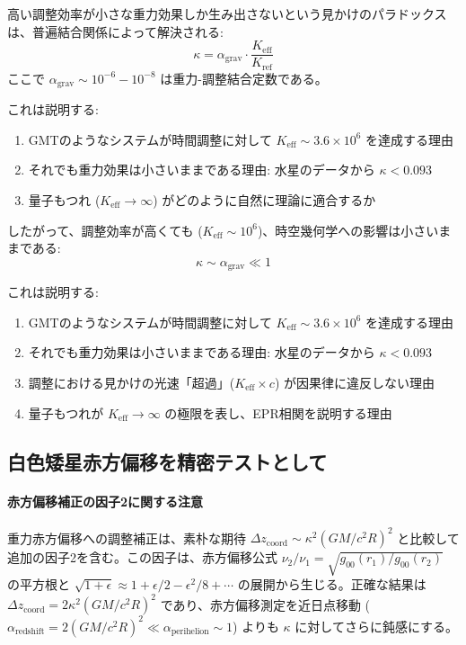 \documentclass[11pt,a4paper]{article}
\begin{document}
	高い調整効率が小さな重力効果しか生み出さないという見かけのパラドックスは、普遍結合関係によって解決される:
	\begin{equation}
		\boxed{\kappa = \alpha_{\text{grav}} \cdot \frac{K_{\mathrm{eff}}}{K_{\text{ref}}}}
	\end{equation}
	ここで $\alpha_{\text{grav}} \sim 10^{-6} - 10^{-8}$ は重力-調整結合定数である。
	
	これは説明する:
	\begin{enumerate}
		\item GMTのようなシステムが時間調整に対して $K_{\mathrm{eff}} \sim 3.6\times10^6$ を達成する理由
		\item それでも重力効果は小さいままである理由: 水星のデータから $\kappa < 0.093$
		\item 量子もつれ ($K_{\mathrm{eff}} \to \infty$) がどのように自然に理論に適合するか
	\end{enumerate}
	
	したがって、調整効率が高くても ($K_{\mathrm{eff}} \sim 10^6$)、時空幾何学への影響は小さいままである:
	\[
	\kappa \sim \alpha_{\text{grav}} \ll 1
	\]
	
	これは説明する:
	\begin{enumerate}
		\item GMTのようなシステムが時間調整に対して $K_{\mathrm{eff}} \sim 3.6\times10^6$ を達成する理由
		\item それでも重力効果は小さいままである理由: 水星のデータから $\kappa < 0.093$
		\item 調整における見かけの光速「超過」($K_{\mathrm{eff}} \times c$) が因果律に違反しない理由
		\item 量子もつれが $K_{\mathrm{eff}} \to \infty$ の極限を表し、EPR相関を説明する理由
	\end{enumerate}
	
	\subsection{白色矮星赤方偏移を精密テストとして}
	\paragraph{赤方偏移補正の因子2に関する注意}
	重力赤方偏移への調整補正は、素朴な期待 $\Delta z_{\text{coord}} \sim \kappa^2 (GM/c^2R)^2$ と比較して追加の因子2を含む。この因子は、赤方偏移公式 $\nu_2/\nu_1 = \sqrt{g_{00}(r_1)/g_{00}(r_2)}$ の平方根と $\sqrt{1 + \epsilon} \approx 1 + \epsilon/2 - \epsilon^2/8 + \cdots$ の展開から生じる。正確な結果は $\Delta z_{\text{coord}} = 2\kappa^2 (GM/c^2R)^2$ であり、赤方偏移測定を近日点移動 ($\alpha_{\text{redshift}} = 2(GM/c^2R)^2 \ll \alpha_{\text{perihelion}} \sim 1$) よりも $\kappa$ に対してさらに鈍感にする。
	
\end{document}
